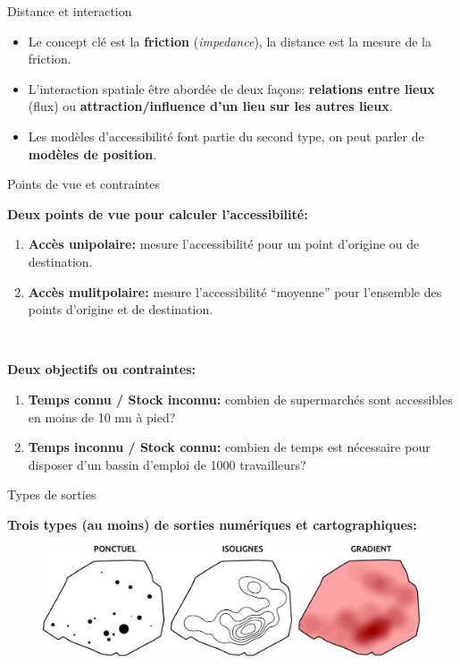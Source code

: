 \begin{frame}{Distance et interaction}

\begin{itemize}
  \item Le concept clé est la \textbf{friction} (\textit{impedance}), la distance est la mesure de la friction.
  \item L'interaction spatiale être abordée de deux façons: \textbf{relations entre lieux} (flux) ou \textbf{attraction/influence d'un lieu sur les autres lieux}. 
  \item Les modèles d'accessibilité font partie du second type, on peut parler de \textbf{modèles de position}. 
\end{itemize}

\end{frame}



\begin{frame}{Points de vue et contraintes}

\textbf{Deux points de vue pour calculer l'accessibilité:}

\begin{enumerate}
  \item \textbf{Accès unipolaire:} mesure l'accessibilité pour un point d'origine ou de destination.
  \item \textbf{Accès mulitpolaire:} mesure l'accessibilité ``moyenne'' pour l'ensemble des points d'origine et de destination.
\end{enumerate}

~

\textbf{Deux objectifs ou contraintes:}

\begin{enumerate}
  \item \textbf{Temps connu / Stock inconnu:} combien de supermarchés sont accessibles en moins de 10 mn à pied?
  \item \textbf{Temps inconnu / Stock connu:} combien de temps est nécessaire pour disposer d'un bassin d'emploi de 1000 travailleurs?
\end{enumerate}

\end{frame}


\begin{frame}{Types de sorties}

\textbf{Trois types (au moins) de sorties numériques et cartographiques:}

\begin{figure}
  \includegraphics[width=12cm]{TroisSorties.pdf}
\end{figure}


\end{frame}



